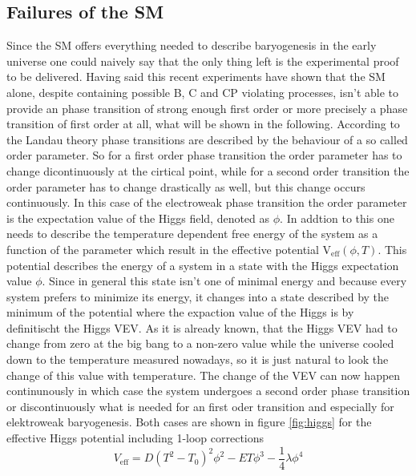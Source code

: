 \subsection{Failures of the SM}
Since the SM offers everything needed to describe baryogenesis in the early universe one could naively say that the only thing left is the experimental proof to be delivered. \newline
Having said this recent experiments have shown that the SM alone, despite containing possible B, C and CP violating processes, isn't able to provide an phase transition of strong enough first order or more precisely a phase transition of first order at all, what will be shown in the following. \newline
According to the Landau theory phase transitions are described by the behaviour of a so called order parameter. So for a first order phase transition the order parameter has to change dicontinuously at the cirtical point, while for a second order transition the order parameter has to change drastically as well, but this change occurs continuously. In this case of the electroweak phase transition the order parameter is the expectation value of the Higgs field, denoted as $\phi$. In addtion to this one needs to describe the temperature dependent free energy of the system as a function of the parameter which result in the effective potential V$_\text{eff}(\phi,T)$. This potential describes the energy of a system in a state with the Higgs expectation value $\phi$. Since in general this state isn't one of minimal energy and because every system prefers to minimize its energy, it changes into a state described by the minimum of the potential where the expaction value of the Higgs is by definitischt the Higgs VEV. \newline
As it is already known, that the Higgs VEV had to change from zero at the big bang to a non-zero value while the universe cooled down to the temperature measured nowadays, so it is just natural to look the change of this value with temperature. The change of the VEV can now happen continunously in which case the system undergoes a second order phase transition or discontinuously what is needed for an first oder transition and especially for elektroweak baryogenesis. 
Both cases are shown in figure \ref{fig:higgs} for the effective Higgs potential including 1-loop corrections \cite{Petropoulos:2003pm}
\begin{equation}
	V_\text{eff}=D(T^2-T_0)^2\phi^2-ET\phi^3-\frac{1}{4}\lambda\phi^4
	\label{effective_pot}
\end{equation}
